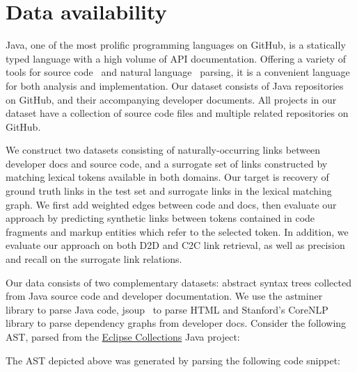 \documentclass{article}
\begin{document}
\section{Data availability}

Java, one of the most prolific programming languages on GitHub, is a statically typed language with a high volume of API documentation. Offering a variety of tools for source code~\citep{parr2013definitive, hosseini2013javaparser, kovalenko2019pathminer} and natural language~\citep{manning2014stanford, grella2018non} parsing, it is a convenient language for both analysis and implementation. Our dataset consists of Java repositories on GitHub, and their accompanying developer documents. All projects in our dataset have a collection of source code files and multiple related repositories on GitHub.

We construct two datasets consisting of naturally-occurring links between developer docs and source code, and a surrogate set of links constructed by matching lexical tokens available in both domains. Our target is recovery of ground truth links in the test set and surrogate links in the lexical matching graph. We first add weighted edges between code and docs, then evaluate our approach by predicting synthetic links between tokens contained in code fragments and markup entities which refer to the selected token. In addition, we evaluate our approach on both D2D and C2C link retrieval, as well as precision and recall on the surrogate link relations.

Our data consists of two complementary datasets: abstract syntax trees collected from Java source code and developer documentation. We use the astminer~\citep{kovalenko2019pathminer} library to parse Java code, jsoup~\citep{hedley2009jsoup} to parse HTML and Stanford's CoreNLP~\citep{manning2014stanford} library to parse dependency graphs from developer docs. Consider the following AST, parsed from the \href{https://www.eclipse.org/collections/}{Eclipse Collections} Java project:

\vspace{20pt}

\begin{figure}[H]
    \centering
    
    \label{fig:ast}
\end{figure}

\vspace{-30pt}The AST depicted above was generated by parsing the following code snippet:
\end{document}
